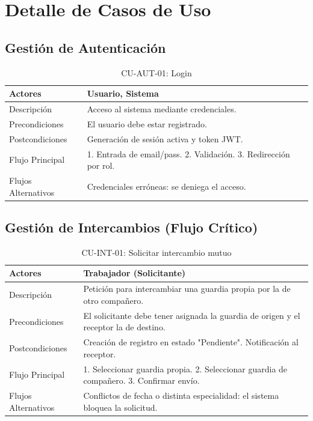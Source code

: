 \section{Detalle de Casos de Uso}

\subsection{Gestión de Autenticación}

\begin{table}[H]
\caption{CU-AUT-01: Login}\label{tab:cu-login}
\begin{center}
    \begin{tabular}{|l|p{11cm}|}
    \hline
    Actores & Usuario, Sistema \\ \hline
    Descripción & Acceso al sistema mediante credenciales. \\ \hline
    Precondiciones & El usuario debe estar registrado. \\ \hline
    Postcondiciones & Generación de sesión activa y token JWT. \\ \hline
    Flujo Principal & 1. Entrada de email/pass. 2. Validación. 3. Redirección por rol. \\ \hline
    Flujos Alternativos & Credenciales erróneas: se deniega el acceso. \\ \hline
    \end{tabular}
\end{center}
\end{table}

\subsection{Gestión de Intercambios (Flujo Crítico)}

\begin{table}[H]
\caption{CU-INT-01: Solicitar intercambio mutuo}\label{tab:cu-sol-inter}
\begin{center}
    \begin{tabular}{|l|p{11cm}|}
    \hline
    Actores & Trabajador (Solicitante) \\ \hline
    Descripción & Petición para intercambiar una guardia propia por la de otro compañero. \\ \hline
    Precondiciones & El solicitante debe tener asignada la guardia de origen y el receptor la de destino. \\ \hline
    Postcondiciones & Creación de registro en estado "Pendiente". Notificación al receptor. \\ \hline
    Flujo Principal & 1. Seleccionar guardia propia. 2. Seleccionar guardia de compañero. 3. Confirmar envío. \\ \hline
    Flujos Alternativos & Conflictos de fecha o distinta especialidad: el sistema bloquea la solicitud. \\ \hline
    \end{tabular}
\end{center}
\end{table}

